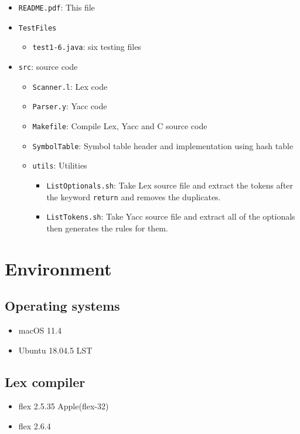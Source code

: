\documentclass[12pt]{article}
\begin{document}
\begin{itemize}
    \item \texttt{README.pdf}: This file
    \item \texttt{TestFiles}
    \begin{itemize}
	\item \texttt{test1-6.java}: six testing files
    \end{itemize}
    \item \texttt{src}: source code
    \begin{itemize}
	\item \texttt{Scanner.l}: Lex code
	\item \texttt{Parser.y}: Yacc code
	\item \texttt{Makefile}: Compile Lex, Yacc and C source code
	\item \texttt{SymbolTable}: Symbol table header and implementation using hash table
	\item \texttt{utils}: Utilities
	\begin{itemize}
	    \item \texttt{ListOptionals.sh}: Take Lex source file and extract the tokens after the keyword \texttt{return} and removes the duplicates.
	    \item \texttt{ListTokens.sh}: Take Yacc source file and extract all of the optionals then generates the rules for them.
	\end{itemize}
    \end{itemize}
\end{itemize}

\section{Environment}
\subsection{Operating systems}
\begin{itemize}
    \item macOS 11.4
    \item Ubuntu 18.04.5 LST
\end{itemize}
\subsection{Lex compiler}
\begin{itemize}
    \item flex 2.5.35 Apple(flex-32)
    \item flex 2.6.4
\end{itemize}
\end{document}
